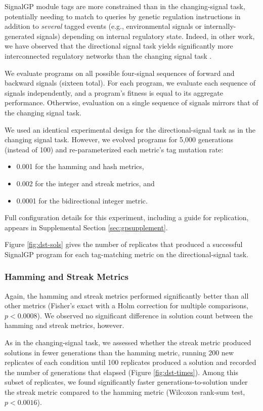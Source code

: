 SignalGP module tags are more constrained than in the changing-signal task, potentially needing to match to queries by genetic regulation instructions in addition to \textit{several} tagged events (e.g., environmental signals or internally-generated signals) depending on internal regulatory state.
Indeed, in other work, we have observed that the directional signal task yields significantly more interconnected regulatory networks than the changing signal task \citep{Lalejini_Moreno_Ofria_2020}.

We evaluate programs on all possible four-signal sequences of forward and backward signals (sixteen total).
For each program, we evaluate each sequence of signals independently, and a program's fitness is equal to its aggregate performance.
Otherwise, evaluation on a single sequence of signals mirrors that of the changing signal task.

We used an identical experimental design for the directional-signal task as in the changing signal task.
However, we evolved programs for 5,000 generations (instead of 100) and re-parameterized each metric's tag mutation rate:
\begin{itemize}
\item 0.001 for the hamming and hash metrics,
\item 0.002 for the integer and streak metrics, and
\item 0.0001 for the bidirectional integer metric.
\end{itemize}
Full configuration details for this experiment, including a guide for replication, appears in Supplemental Section \ref{sec:gpsupplement}.

Figure \ref{fig:dst-sols} gives the number of replicates that produced a successful SignalGP program for each tag-matching metric on the directional-signal task.

\subsubsection{Hamming and Streak Metrics}

Again, the hamming and streak metrics performed significantly better than all other metrics (Fisher's exact with a Holm correction for multiple comparisons, $p < 0.0008$).
We observed no significant difference in solution count between the hamming and streak metrics, however.

As in the changing-signal task, we assessed whether the streak metric produced solutions in fewer generations than the hamming metric, running 200 new replicates of each condition until 100 replicates produced a solution and recorded the number of generations that elapsed (Figure \ref{fig:dst-times}).
Among this subset of replicates, we found significantly faster generations-to-solution under the streak metric compared to the hamming metric (Wilcoxon rank-sum test, $p < 0.0016$).

